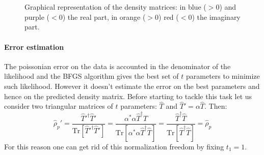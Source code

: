 \documentclass[a4paper, 11pt]{article}
\begin{document}
      \begin{figure}
        \centering
        \begin{subfigure}[$\hat{\rho}^{(1)}$ via linear inversion]{
          \label{fig:tomo_li_1}}
        \end{subfigure}
        \begin{subfigure}[$\hat{\rho}^{(1)}$ via maximum likelihood]{
          \label{fig:tomo_ml_1}}
        \end{subfigure} \\
        \begin{subfigure}[$\hat{\rho}^{(2)}$ via linear inversion]{
          \label{fig:tomo_li_2}}
        \end{subfigure}
        \begin{subfigure}[$\hat{\rho}^{(2)}$ via maximum likelihood]{
          \label{fig:tomo_ml_2}}
        \end{subfigure} \\
        \begin{subfigure}[$\hat{\rho}^{(3)}$ via linear inversion]{
          \label{fig:tomo_li_3}}
        \end{subfigure}
        \begin{subfigure}[$\hat{\rho}^{(3)}$ via maximum likelihood]{
          \label{fig:tomo_ml_3}}
        \end{subfigure}
        \caption{Graphical representation of the density matrices: in blue ($>0$) and purple ($<0$) the real part, in orange ($>0$) red ($<0$) the imaginary part.}
      \end{figure}

      \paragraph{Error estimation}
        The poissonian error on the data is accounted in the denominator of the likelihood and the BFGS algorithm gives the best set of $t$ parameters to minimize such likelihood. However it doesn't estimate the error on the best parameters and hence on the predicted density matrix. Before starting to tackle this task let us consider two triangular matrices of $t$ parameters: $\hat{T}$ and $\hat{T}' = \alpha\hat{T}$. Then:
        \begin{equation*}
          \hat{\rho}_p' = \frac{\hat{T}'^\dagger \hat{T}'}{\text{Tr}[\hat{T}'^\dagger \hat{T}']}
          = \frac{\alpha^*\alpha\hat{T}^\dagger \hat{T}}{\text{Tr}[\alpha^*\alpha\hat{T}^\dagger \hat{T}]}
          = \frac{\hat{T}^\dagger \hat{T}}{\text{Tr}[\hat{T}^\dagger \hat{T}]}
          = \hat{\rho}_p
        \end{equation*}
        For this reason one can get rid of this normalization freedom by fixing $t_1 = 1$.
\end{document}
